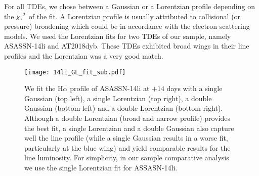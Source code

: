 \documentclass[structabstract]{aa}
\begin{document}
For all TDEs, we chose between a Gaussian or a Lorentzian profile depending on the ${\rm \chi_{\rm \nu}}^{2}$ of the fit. A Lorentzian profile is usually attributed to collisional (or pressure) broadening which could be in accordance with the electron scattering \citep{Roth2017} models. 
We used the Lorentzian fits for two TDEs of our sample, namely ASASSN-14li and AT2018dyb. These TDEs exhibited broad wings in their line profiles and the Lorentzian was a very good match. 

\begin{figure}
\centering
\texttt{[image: 14li\_GL\_fit\_sub.pdf]}
\caption{We fit the H$\alpha$ profile of ASASSN-14li at $+14$ days with a single Gaussian (top left), a single Lorentzian (top right), a double Gaussian (bottom left) and a double Lorentzian (bottom right). Although a double Lorentzian (broad and narrow profile) provides the best fit, a single Lorentzian and a double Gaussian also capture well the line profile (while a single Gaussian results in a worse fit, particularly at the blue wing) and yield comparable results for the line luminosity. For simplicity, in our sample comparative analysis we use the single Lorentzian fit for ASSASN-14li.
}\label{fig:GL_fits0}
\end{figure}
\end{document}
